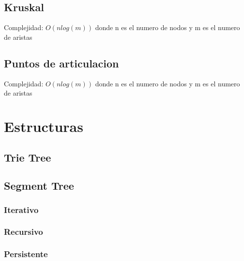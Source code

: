 \documentclass[10pt,a4paper,twocolumn]{article}
\begin{document}
		
		\subsection{Kruskal}
Complejidad: $O(nlog(m))$ donde n es el numero de nodos y m es el numero de aristas
		
		
		
		\subsection{Puntos de articulacion}
Complejidad: $O(nlog(m))$ donde n es el numero de nodos y m es el numero de aristas
		
		
		
		\section{Estructuras}
		\subsection{Trie Tree}
		
		
		\subsection{Segment Tree}
		\subsubsection{Iterativo}
		
		
		\subsubsection{Recursivo}
		
		
		\subsubsection{Persistente}
		
		
\end{document}

